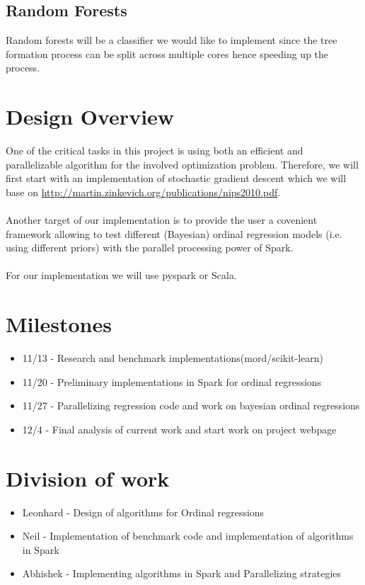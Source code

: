 \documentclass{article}
\begin{document}
	\subsection{Random Forests}
	Random forests will be a classifier we would like to implement since the tree formation process can be split across multiple cores hence speeding up the process.

	\section{Design Overview}
	One of the critical tasks in this project is using both an efficient and parallelizable algorithm for the involved optimization problem. Therefore, we will first start with an implementation of stochastic gradient descent which we will base on \href{Reference}{http://martin.zinkevich.org/publications/nips2010.pdf}.
	\\
	\\
	Another target of our implementation is to provide the user a covenient framework allowing to test different (Bayesian) ordinal regression models (i.e. using different priors) with the parallel processing power of Spark.
	\\
	\\
	For our implementation we will use pyspark or Scala.


	\section{Milestones}
		\begin{itemize}
			\item 11/13 - Research and benchmark implementations(mord/scikit-learn)
			\item 11/20 - Preliminary implementations in Spark for ordinal regressions
			\item 11/27 - Parallelizing regression code and work on bayesian ordinal regressions
			\item 12/4 - Final analysis of current work and start work on project webpage
		\end{itemize}

	\section{Division of work}
		\begin{itemize}
			\item Leonhard - Design of algorithms for Ordinal regressions
			\item Neil - Implementation of benchmark code and implementation of algorithms in Spark
			\item Abhishek - Implementing algorithms in Spark and Parallelizing strategies
		\end{itemize}
\end{document}
